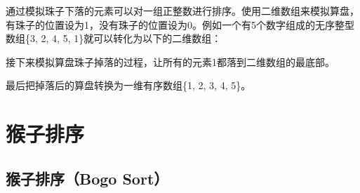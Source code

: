 通过模拟珠子下落的元素可以对一组正整数进行排序。使用二维数组来模拟算盘，有珠子的位置设为1，没有珠子的位置设为0。例如一个有5个数字组成的无序整型数组\{3, 2, 4, 5, 1\}就可以转化为以下的二维数组：

\begin{table}[H]
    \centering
    \caption{模拟算盘}
\end{table}

接下来模拟算盘珠子掉落的过程，让所有的元素1都落到二维数组的最底部。

\begin{table}[H]
    \centering
\end{table}

最后把掉落后的算盘转换为一维有序数组\{1, 2, 3, 4, 5\}。

\newpage

\section{猴子排序}

\subsection{猴子排序（Bogo Sort）}

